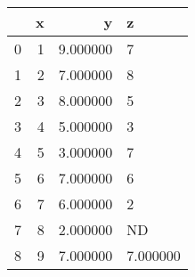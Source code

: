 \begin{tabular}{lrrl}
\toprule
 & x & y & z \\
\midrule
0 & 1 & 9.000000 & 7 \\
1 & 2 & 7.000000 & 8 \\
2 & 3 & 8.000000 & 5 \\
3 & 4 & 5.000000 & 3 \\
4 & 5 & 3.000000 & 7 \\
5 & 6 & 7.000000 & 6 \\
6 & 7 & 6.000000 & 2 \\
7 & 8 & 2.000000 & ND \\
8 & 9 & 7.000000 & 7.000000 \\
\bottomrule
\end{tabular}
